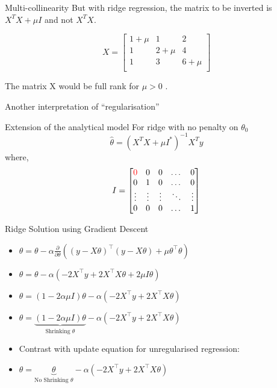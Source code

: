 \documentclass{beamer}
\begin{document}
\begin{frame}{Multi-collinearity}
But with ridge regression, the matrix to be inverted is $X^{T}X + \mu I$ and not $X^{T}X$.

\begin{equation*}
X = \begin{bmatrix}
1+\mu & 1& 2\\
1 & 2+\mu & 4\\
1 & 3& 6+\mu \\
\end{bmatrix}
\end{equation*}

The matrix X would be full rank for $\mu>0$ . 

\pause Another interpretation of ``regularisation''
\end{frame}


\begin{frame}{Extension of the analytical model}
For ridge with no penalty on $\theta_0$
$$
\hat{\theta} = \left(X^TX+\mu I^*\right)^{-1}X^Ty
$$
where, $$I = \begin{bmatrix}
    \color{red}0 & 0 & 0 & \dots  & 0 \\
    0 & 1& 0 & \dots  & 0\\
    \vdots & \vdots & \vdots & \ddots & \vdots \\
    0 & 0 & 0 & \dots  & 1
\end{bmatrix}$$
\end{frame}


{
	
}

\begin{frame}{Ridge Solution using Gradient Descent}
\begin{itemize}[<+->]
	\item \(\theta=\theta - \alpha \frac{\partial}{\partial \theta}(\left(y-X\theta\right)^{\top}\left(y-X\theta\right)+\mu\theta^{\top}\theta)\) 
	\item \(\theta=\theta - \alpha(-2 X^{\top} y+2 X^{\top} X \theta + 2\mu I \theta)\)
	\item \(\theta=(1-2\alpha\mu I)\theta - \alpha(-2 X^{\top} y+2 X^{\top} X \theta)\)
	\item \(\theta=\underbrace{(1-2\alpha\mu I)\theta}_\text{Shrinking $\theta$} - \alpha(-2 X^{\top} y+2 X^{\top} X \theta)\)
\end{itemize}
\pause \begin{itemize}

	\item Contrast with update equation for unregularised regression:
	\item \(\theta=\underbrace{\theta}_\text{No Shrinking $\theta$} - \alpha(-2 X^{\top} y+2 X^{\top} X \theta)\)
	
\end{itemize}

\end{frame}

{
	
}
\end{document}
